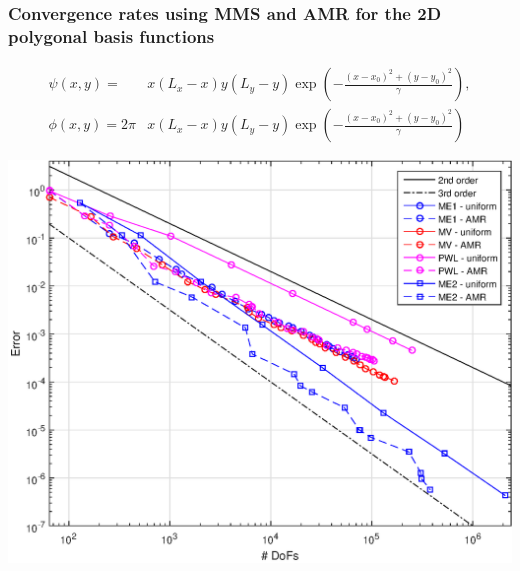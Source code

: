 \documentclass[compress,10pt]{beamer}
\begin{document}
\begin{frame}[t]
\begin{columns}
{}
\end{columns}
\end{frame}
\begin{frame}[t]\frametitle{Convergence rates using MMS and AMR for the 2D polygonal basis functions}
\begin{block}{}
\begin{equation*}
\begin{aligned}
\psi (x,y) = & x (L_x - x) y (L_y - y) \exp(-\frac{(x-x_0)^2 + (y-y_0)^2}{\gamma}), \\ 
\phi (x,y) = 2 \pi & x (L_x - x) y (L_y - y) \exp(-\frac{(x-x_0)^2 + (y-y_0)^2}{\gamma})
\end{aligned}
\end{equation*}
\end{block}
\centering
{}\includegraphics[width=0.55\columnwidth]{images/Transport_Gauss_2D_AMR_Error_Plot.eps}
\end{frame}
\end{document}
